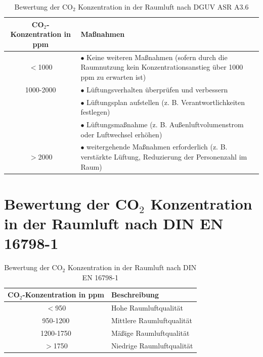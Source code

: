 \documentclass[a4paper,
    12pt,
    headings=small,
    ngerman,
    listof=totoc,
    numbers=noenddot]{scrreprt}[2021/11/13]
\begin{document}
\begin{table}[htbp]
  \centering
  \renewcommand{\arraystretch}{1.25}
  \caption{Bewertung der CO$_2$ Konzentration in der Raumluft nach \ac{DGUV} \ac{ASR} A3.6 \autocite{ASR}}
  \begin{tabular}{c|p{}}
    CO$_2$-Konzentration in \ac{ppm} & Maßnahmen                                                                                                                  \\
    \hline
    $<$1000                          & $\bullet$ Keine weiteren Maßnahmen (sofern durch die Raumnutzung kein Konzentrationsanstieg über 1000 ppm zu erwarten ist) \\
    \hline
    1000-2000                        & $\bullet$ Lüftungsverhalten überprüfen und verbessern                                                                      \\
                                     & $\bullet$ Lüftungsplan aufstellen (z. B. Verantwortlichkeiten festlegen)                                                   \\
                                     & $\bullet$ Lüftungsmaßnahme (z. B. Außenluftvolumenstrom oder Luftwechsel erhöhen)                                          \\
    \hline
    $>$2000                          & $\bullet$ weitergehende Maßnahmen erforderlich (z. B. verstärkte Lüftung, Reduzierung der Personenzahl im Raum)            \\
  \end{tabular}
  \label{appendix:tab:dguv_table_co2}
\end{table}

\chapter{Bewertung der CO\texorpdfstring{$_2$}{TEXT} Konzentration in der Raumluft nach DIN EN 16798-1}

\begin{table}[htbp]
  \centering
  \renewcommand{\arraystretch}{1.25}
  \caption{Bewertung der CO$_2$ Konzentration in der Raumluft nach DIN EN 16798-1 \autocite{din_en_16798}}
  \begin{tabular}{c|p{}}
    CO$_2$-Konzentration in \ac{ppm} & Beschreibung              \\
    \hline
    $<$950                           & Hohe Raumluftqualität     \\
    950-1200                         & Mittlere Raumluftqualität \\
    1200-1750                        & Mäßige Raumluftqualität   \\
    $>$1750                          & Niedrige Raumluftqualität \\
  \end{tabular}
  \label{appendix:tab:din_table_co2}
\end{table}
\end{document}
